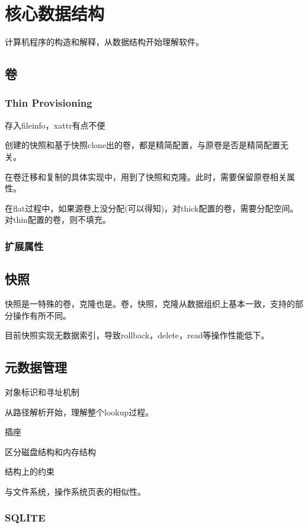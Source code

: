 \chapter{核心数据结构}

计算机程序的构造和解释，从数据结构开始理解软件。

\section{卷}

\subsection{Thin Provisioning}

存入fileinfo，xattr有点不便

创建的快照和基于快照clone出的卷，都是精简配置，与原卷是否是精简配置无关。

在卷迁移和复制的具体实现中，用到了快照和克隆。此时，需要保留原卷相关属性。

在flat过程中，如果源卷上没分配(可以得知)，对thick配置的卷，需要分配空间。
对thin配置的卷，则不填充。

\subsection{扩展属性}

\section{快照}

快照是一特殊的卷，克隆也是。卷，快照，克隆从数据组织上基本一致，支持的部分操作有所不同。

目前快照实现无数据索引，导致rollback，delete，read等操作性能低下。

\section{元数据管理}

对象标识和寻址机制

从路径解析开始，理解整个lookup过程。

插座

区分磁盘结构和内存结构

结构上的约束

与文件系统，操作系统页表的相似性。

\subsection{SQLITE}

